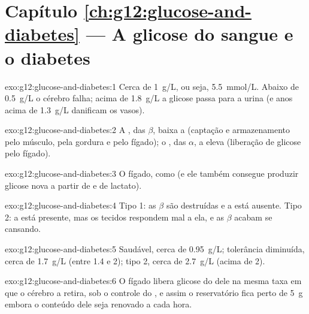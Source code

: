 \section*{Capítulo \ref{ch:g12:glucose-and-diabetes} --- A glicose do sangue e o diabetes}

\begin{solution}{exo:g12:glucose-and-diabetes:1}
Cerca de \qty{1}{g/L}, ou seja, \qty{5.5}{mmol/L}. Abaixo de
\qty{0.5}{g/L} o cérebro falha; acima de \qty{1.8}{g/L} a glicose passa
para a urina (e anos acima de \qty{1.3}{g/L} danificam os vasos).
\end{solution}

\begin{solution}{exo:g12:glucose-and-diabetes:2}
A , das  $\beta$, baixa a  (captação e
armazenamento pelo músculo, pela gordura e pelo fígado); o ,
das  $\alpha$, a eleva (liberação de glicose pelo fígado).
\end{solution}

\begin{solution}{exo:g12:glucose-and-diabetes:3}
O fígado, como  (e ele também consegue produzir glicose nova
a partir de  e de lactato).
\end{solution}

\begin{solution}{exo:g12:glucose-and-diabetes:4}
Tipo 1: as  $\beta$ são destruídas e a  está ausente.
Tipo 2: a  está presente, mas os tecidos respondem mal a ela, e
as  $\beta$ acabam se cansando.
\end{solution}

\begin{solution}{exo:g12:glucose-and-diabetes:5}
Saudável, cerca de \qty{0.95}{g/L}; tolerância diminuída, cerca de
\qty{1.7}{g/L} (entre 1.4 e 2); tipo 2, cerca de \qty{2.7}{g/L} (acima de 2).
\end{solution}

\begin{solution}{exo:g12:glucose-and-diabetes:6}
O fígado libera glicose do  dele na mesma taxa em que o
cérebro a retira, sob o controle do , e assim o reservatório
fica perto de \qty{5}{g} embora o conteúdo dele seja renovado a cada hora.
\end{solution}

